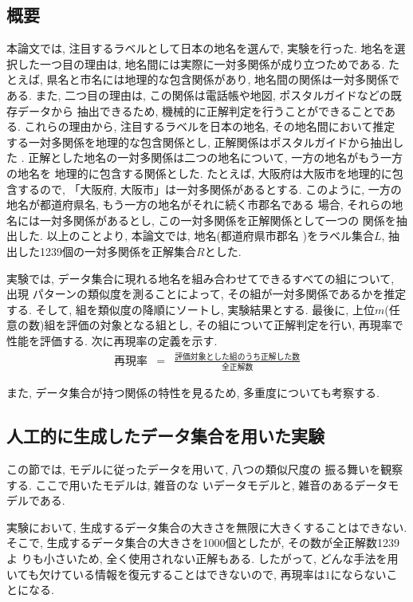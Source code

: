 \subsection{概要} 
本論文では, 注目するラベルとして日本の地名を選んで, 実験を行った.
地名を選択した一つ目の理由は, 地名間には実際に一対多関係が成り立つためである. 
たとえば, 県名と市名には地理的な包含関係があり, 
地名間の関係は一対多関係である. 
また, 二つ目の理由は, この関係は電話帳や地図, ポスタルガイドなどの既存データから
抽出できるため, 機械的に正解判定を行うことができることである. 
これらの理由から, 注目するラベルを日本の地名, その地名間において推定
する一対多関係を地理的な包含関係とし, 正解関係はポスタルガイドから抽出した
. 
正解とした地名の一対多関係は二つの地名について, 一方の地名がもう一方の地名を
地理的に包含する関係とした. たとえば, 大阪府は大阪市を地理的に包含するので, 
「大阪府, 大阪市」は一対多関係があるとする. 
このように, 一方の地名が都道府県名, もう一方の地名がそれに続く市郡名である
場合, 
それらの地名には一対多関係があるとし, この一対多関係を正解関係として一つの
関係を抽出した. 
以上のことより, 本論文では, 地名(都道府県市郡名
)をラベル集合$L$, 抽出した1239個の一対多関係を正解集合$R$とした. 

実験では, データ集合に現れる地名を組み合わせてできるすべての組について, 出現
パターンの類似度を測ることによって, その組が一対多関係であるかを推定する. 
そして, 組を類似度の降順にソートし, 実験結果とする. 
最後に, 上位$m$(任意の数)組を評価の対象となる組とし, その組について正解判定を行い, 
再現率で性能を評価する. 次に再現率の定義を示す. 
\begin{eqnarray*}
再現率 &=& \frac{評価対象とした組のうち正解した数}{全正解数}
\end{eqnarray*}

また, データ集合が持つ関係の特性を見るため, 多重度についても考察する.

\subsection{人工的に生成したデータ集合を用いた実験} \label{art-data}
この節では, モデルに従ったデータを用いて, 八つの類似尺度の
振る舞いを観察する. ここで用いたモデルは, 雑音のな
いデータモデルと, 雑音のあるデータモデルである. 

実験において, 生成するデータ集合の大きさを無限に大きくすることはできない. 
そこで, 生成するデータ集合の大きさを1000個としたが, その数が全正解数1239よ
りも小さいため, 全く使用されない正解もある. 
したがって, どんな手法を用いても欠けている情報を復元することはできないので, 
再現率は$1$にならないことになる. 

